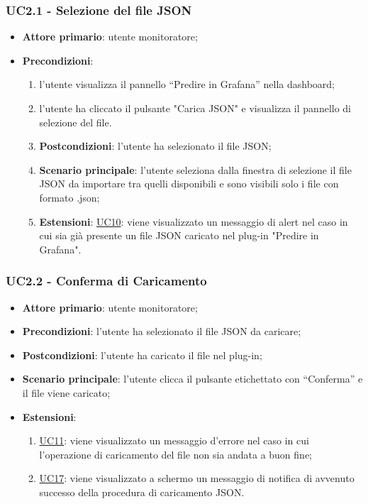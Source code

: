 		
		\label{par:UC2.1}
		\subsubsection{UC2.1 - Selezione del file JSON}
		\begin{itemize}
			\item\textbf{Attore primario}: utente monitoratore;
			\item\textbf{Precondizioni}:
				\begin{enumerate}
					\item l’utente visualizza il pannello “Predire in Grafana” nella dashboard;
					\item l’utente ha cliccato il pulsante "Carica JSON" e visualizza il pannello di selezione del file.
			\item\textbf{Postcondizioni}: l’utente ha selezionato il file JSON;
			\item\textbf{Scenario principale}: l’utente seleziona dalla finestra di selezione il file JSON da importare tra quelli disponibili e sono visibili solo i file con formato .json;
			\item\textbf{Estensioni}: \hyperref[par:UC10]{UC10}: viene visualizzato un messaggio di alert nel caso in cui sia già presente un file JSON caricato nel plug-in "Predire in Grafana".
				\end{enumerate}
			\end{itemize}
		
		\label{par:UC2.2}
		\subsubsection{UC2.2 - Conferma di Caricamento}
		\begin{itemize}
			\item\textbf{Attore primario}: utente monitoratore;
			\item\textbf{Precondizioni}: l’utente ha selezionato il file JSON da caricare;
			\item\textbf{Postcondizioni}: l’utente ha caricato il file nel plug-in;
			\item\textbf{Scenario principale}: l’utente clicca il pulsante etichettato con “Conferma” e il file viene caricato;
			\item\textbf{Estensioni}:
				\begin{enumerate}
					\item\hyperref[par:UC11]{UC11}: viene visualizzato un messaggio d’errore nel caso in cui l’operazione di caricamento del file non sia andata a buon fine;	
					\item\hyperref[par:UC17]{UC17}: viene visualizzato a schermo un messaggio di notifica di avvenuto successo della procedura di caricamento JSON.
				\end{enumerate}	
		\end{itemize}

